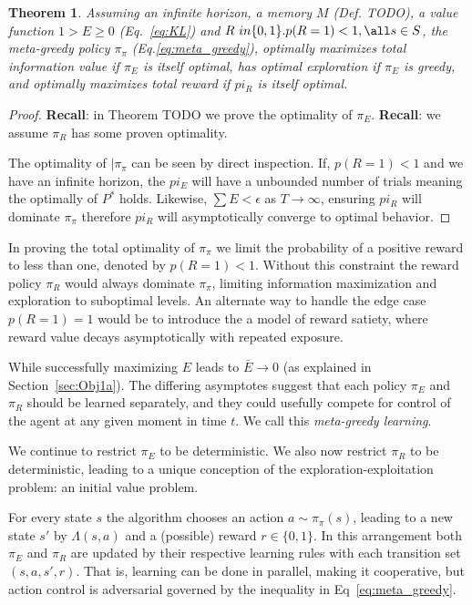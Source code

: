 \documentclass[9pt,twocolumn,twoside]{pnas-new}
\newtheorem{theorem}{Theorem}
\begin{document}
\begin{theorem}
    Assuming an infinite horizon, a memory $M$ (Def. TODO), a value function $1 > E \ge 0$ (Eq.~\ref{eq:KL}) and $R\ in \{0, 1\}. p(R = 1) < 1, \all s \in S$, the \textit{meta-greedy} policy $\pi_{\pi}$ (Eq.\ref{eq:meta_greedy}), optimally maximizes total information value if $\pi_E$ is itself optimal, has optimal exploration if $\pi_E$ is greedy, and optimally maximizes total reward if $pi_R$ is itself optimal.
\end{theorem}
\begin{proof}
    \textbf{Recall}: in Theorem TODO we prove the optimality of $\pi_E$.
    \textbf{Recall}: we assume $\pi_R$ has some proven optimality.

    The optimality of $|\pi_{\pi}$ can be seen by direct inspection. If, $p(R = 1) < 1$ and we have an infinite horizon, the $pi_E$ will have a unbounded number of trials meaning the optimally of $P^*$ holds. Likewise, $\sum E < \epsilon$ as $T \rightarrow \infty$, ensuring $pi_R$ will dominate $\pi_{\pi}$ therefore $pi_R$ will asymptotically converge to optimal behavior.
\end{proof}

In proving the total optimality of $\pi_{\pi}$ we limit the probability of a positive reward to less than one, denoted by $p(R = 1) < 1$. Without this constraint the reward policy $\pi_R$ would always dominate $\pi_{\pi}$, limiting information maximization and exploration to suboptimal levels. An alternate way to handle the edge case $p(R = 1) = 1$ would be to introduce the a model of reward satiety, where reward value decays asymptotically with repeated exposure. %


While successfully maximizing $E$ leads to $\bar E \rightarrow 0$ (as explained in Section~\ref{sec:Obj1a}). The differing asymptotes suggest that each policy $\pi_E$ and $\pi_R$ should be learned separately, and they could usefully compete for control of the agent at any given moment in time $t$. We call this \textit{meta-greedy learning}.

We continue to restrict $\pi_E$ to be deterministic. We also now restrict $\pi_R$ to be deterministic, leading to a unique conception of the exploration-exploitation problem: an initial value problem. 

For every state $s$ the algorithm chooses an action $a \sim \pi_{\pi}(s)$, leading to a new state $s'$ by $\Lambda(s, a)$ and a (possible) reward $r \in \{0,1\}$. In this arrangement both $\pi_E$ and $\pi_R$ are updated by their respective learning rules with each transition set $(s, a, s', r)$. That is, learning can be done in parallel, making it cooperative, but action control is adversarial governed by the inequality in Eq~\ref{eq:meta_greedy}.
\end{document}

